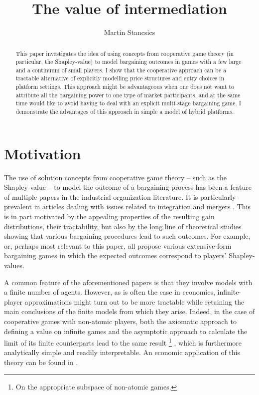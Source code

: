 \documentclass[a4paper]{article}
\title{The value of intermediation}
\author{Martin Stancsics}
\begin{document}
\maketitle

\begin{abstract}
    This paper investigates the idea of using concepts from cooperative game theory (in particular, the Shapley-value) to model bargaining outcomes in games with a few large and a continuum of small players. I show that the cooperative approach can be a tractable alternative of explicitly modelling price structures and entry choices in platform settings. This approach might be advantageous when one does not want to attribute all the bargaining power to one type of market participants, and at the same time would like to avoid having to deal with an explicit multi-stage bargaining game. I demonstrate the advantages of this approach in simple a model of hybrid platforms.
\end{abstract}


\section{Motivation}

The use of solution concepts from cooperative game theory -- such as the Shapley-value -- to model the outcome of a bargaining process has been a feature of multiple papers in the industrial organization literature. It is particularly prevalent in articles dealing with issues related to integration and mergers \parencite[e.g.][]{hart1990property,segal2003collusion,inderst2003bargaining,montez2007downstream}. This is in part motivated by the appealing properties of the resulting gain distributions, their tractability, but also by the long line of theoretical studies showing that various bargaining procedures lead to such outcomes. For example, \textcite{gul1989bargaining,winter1994demand,hart1996bargaining,inderst2003bargaining,} or, perhaps most relevant to this paper, \textcite{stole1996intra} all propose various extensive-form bargaining games in which the expected outcomes correspond to players' Shapley-values.

A common feature of the aforementioned papers is that they involve models with a finite number of agents. However, as is often the case in economics, infinite-player approximations might turn out to be more tractable while retaining the main conclusions of the finite models from which they arise. Indeed, in the case of cooperative games with non-atomic players, both the axiomatic approach to defining a value on infinite games and the asymptotic approach to calculate the limit of its finite counterparts lead to the same result \footnote{On the appropriate subspace of non-atomic games.} \parencite{aumann2015values}, which is furthermore analytically simple and readily interpretable. An economic application of this theory can be found in \textcite{billera1978internal}.
\end{document}
